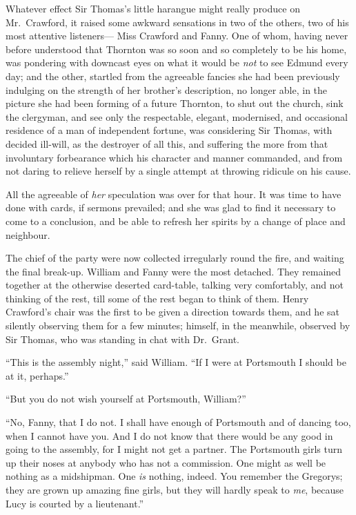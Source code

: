 \documentclass{article}
\begin{document}
Whatever effect Sir Thomas's little harangue might really
produce on Mr.\ Crawford, it raised some awkward sensations
in two of the others, two of his most attentive listeners---%
Miss Crawford and Fanny.  One of whom, having never before
understood that Thornton was so soon and so completely
to be his home, was pondering with downcast eyes on what it
would be \emph{not} to see Edmund every day; and the other,
startled from the agreeable fancies she had been previously
indulging on the strength of her brother's description,
no longer able, in the picture she had been forming of a
future Thornton, to shut out the church, sink the clergyman,
and see only the respectable, elegant, modernised,
and occasional residence of a man of independent fortune,
was considering Sir Thomas, with decided ill-will,
as the destroyer of all this, and suffering the more
from that involuntary forbearance which his character
and manner commanded, and from not daring to relieve
herself by a single attempt at throwing ridicule on his cause.

All the agreeable of \emph{her} speculation was over for that hour.
It was time to have done with cards, if sermons prevailed;
and she was glad to find it necessary to come to a conclusion,
and be able to refresh her spirits by a change of place
and neighbour.

The chief of the party were now collected irregularly
round the fire, and waiting the final break-up. William
and Fanny were the most detached.  They remained
together at the otherwise deserted card-table, talking
very comfortably, and not thinking of the rest, till some
of the rest began to think of them.  Henry Crawford's
chair was the first to be given a direction towards them,
and he sat silently observing them for a few minutes;
himself, in the meanwhile, observed by Sir Thomas,
who was standing in chat with Dr.\ Grant.

``This is the assembly night,'' said William.  ``If I were
at Portsmouth I should be at it, perhaps.''

``But you do not wish yourself at Portsmouth, William?''

``No, Fanny, that I do not.  I shall have enough of Portsmouth
and of dancing too, when I cannot have you.  And I do not
know that there would be any good in going to the assembly,
for I might not get a partner.  The Portsmouth girls turn
up their noses at anybody who has not a commission.
One might as well be nothing as a midshipman.
One \emph{is} nothing, indeed.  You remember the Gregorys;
they are grown up amazing fine girls, but they will hardly
speak to \emph{me}, because Lucy is courted by a lieutenant.''
\end{document}
